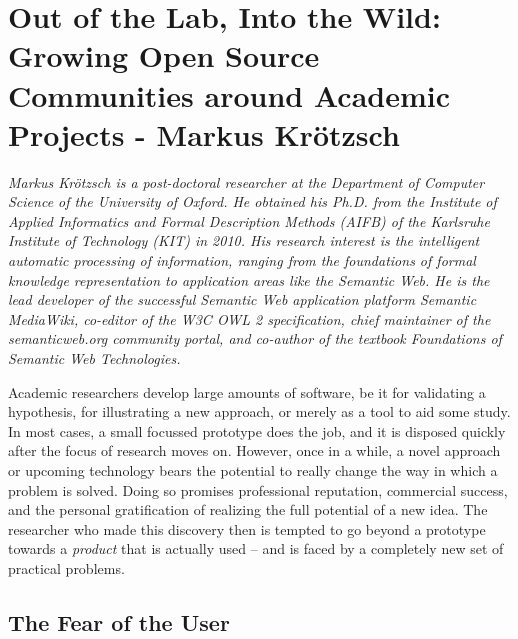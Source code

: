 \chapter{Out of the Lab, Into the Wild: Growing Open Source Communities around
Academic Projects - Markus Kr\"{o}tzsch}

\textit{Markus Kr\"otzsch is a post-doctoral researcher at the Department of
Computer Science of the University of Oxford. He obtained his Ph.D. from the
Institute of Applied Informatics and Formal Description Methods (AIFB) of the
Karlsruhe Institute of Technology (KIT) in 2010. His research interest is the
intelligent automatic processing of information, ranging from the foundations of
formal knowledge representation to application areas like the Semantic Web. He
is the lead developer of the successful Semantic Web application platform
Semantic MediaWiki, co-editor of the W3C OWL 2 specification, chief maintainer
of the semanticweb.org community portal, and co-author of the textbook
Foundations of Semantic Web Technologies.}

Academic researchers develop large amounts of software, be it for validating a
hypothesis, for illustrating a new approach, or merely as a tool to aid some
study. In most cases, a small focussed prototype does the job, and it is
disposed quickly after the focus of research moves on. However, once in a while,
a novel approach or upcoming technology bears the potential to really change the
way in which a problem is solved. Doing so promises professional reputation,
commercial success, and the personal gratification of realizing the full
potential of a new idea. The researcher who made this discovery then is tempted
to go beyond a prototype towards a \emph{product} that is actually used -- and
is faced by a completely new set of practical problems.

\section*{The Fear of the User}

